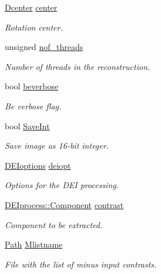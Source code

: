 \begin{DoxyCompactItemize}
\hyperlink{classDcenter}{Dcenter} \hyperlink{structclargs_a754006a265d07d01ba9333ad6f0624d5}{center}
\begin{DoxyCompactList}\small\item\em Rotation center. \item\end{DoxyCompactList}\item 
unsigned \hyperlink{structclargs_a7221e87891bc3836d2e894bf522bc6f7}{nof\_\-threads}
\begin{DoxyCompactList}\small\item\em Number of threads in the reconstruction. \item\end{DoxyCompactList}\item 
bool \hyperlink{structclargs_accb8bf7e8a4a9d0829bc01e714adb2cb}{beverbose}
\begin{DoxyCompactList}\small\item\em Be verbose flag. \item\end{DoxyCompactList}\item 
bool \hyperlink{structclargs_a30c46fe6f88e946e3a5840d7c4ca7531}{SaveInt}
\begin{DoxyCompactList}\small\item\em Save image as 16-\/bit integer. \item\end{DoxyCompactList}\item 
\hyperlink{structDEIoptions}{DEIoptions} \hyperlink{structclargs_ae28454c473f2c5ea18ff989ee5c7578b}{deiopt}
\begin{DoxyCompactList}\small\item\em Options for the DEI processing. \item\end{DoxyCompactList}\item 
\hyperlink{classDEIprocess_a3a41867d8f9d10e77541ae8484256cd2}{DEIprocess::Component} \hyperlink{structclargs_a935d211849fe10f5717d628608bbd4e3}{contrast}
\begin{DoxyCompactList}\small\item\em Component to be extracted. \item\end{DoxyCompactList}\item 
\hyperlink{classPath}{Path} \hyperlink{structclargs_acca6e360a1db6b735f6b1689fb7b4a13}{Mlistname}
\begin{DoxyCompactList}\small\item\em File with the list of minus input contrasts. \item\end{DoxyCompactList}\item 

\end{DoxyCompactItemize}
